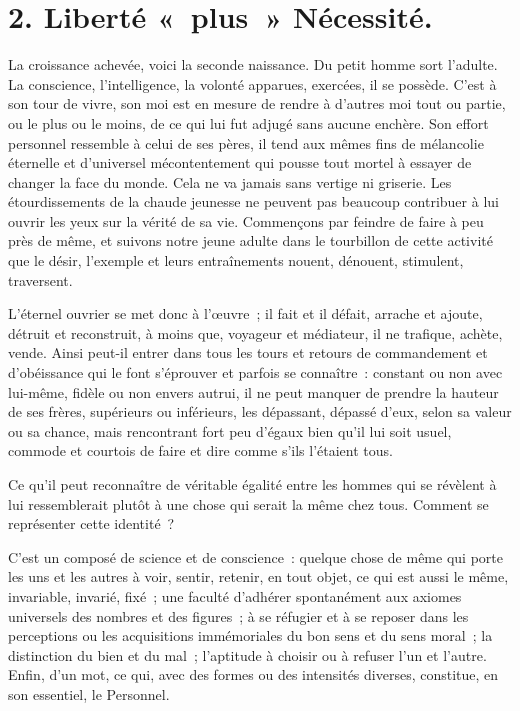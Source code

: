 \documentclass[french,twoside]{book} %
\begin{document}
\section[2. Liberté « plus » Nécessité.]{2. Liberté « plus » Nécessité.}
\noindent La croissance achevée, voici la seconde naissance. Du petit homme sort l’adulte. La conscience, l’intelligence, la volonté apparues, exercées, il se possède. C’est à son tour de vivre, son moi est en mesure de rendre à d’autres moi tout ou partie, ou le plus ou le moins, de ce qui lui fut adjugé sans aucune enchère. Son effort personnel ressemble à celui de ses pères, il tend aux mêmes fins de mélancolie éternelle et d’universel mécontentement qui pousse tout mortel à essayer de changer la face du monde. Cela ne va jamais sans vertige ni griserie. Les étourdissements de la chaude jeunesse ne peuvent pas beaucoup contribuer à lui ouvrir les yeux sur la vérité de sa vie. Commençons par feindre de faire à peu près de même, et suivons notre jeune adulte dans le tourbillon de cette activité que le désir, l’exemple et leurs entraînements nouent, dénouent, stimulent, traversent.\par
L’éternel ouvrier se met donc à l’œuvre ; il fait et il défait, arrache et ajoute, détruit et reconstruit, à moins que, voyageur et médiateur, il ne trafique, achète, vende. Ainsi peut-il entrer dans tous les tours et retours de commandement et d’obéissance qui le font s’éprouver et parfois se connaître : constant ou non avec lui-même, fidèle ou non envers autrui, il ne peut manquer de prendre la hauteur de ses frères, supérieurs ou inférieurs, les dépassant, dépassé d’eux, selon sa valeur ou sa chance, mais rencontrant fort peu d’égaux bien qu’il lui soit usuel, commode et courtois de faire et dire comme s’ils l’étaient tous.\par
Ce qu’il peut reconnaître de véritable égalité entre les hommes qui se révèlent à lui ressemblerait plutôt à une chose qui serait la même chez tous. Comment se représenter cette identité ?\par
C’est un composé de science et de conscience : quelque chose de même qui porte les uns et les autres à voir, sentir, retenir, en tout objet, ce qui est aussi le même, invariable, invarié, fixé ; une faculté d’adhérer spontanément aux axiomes universels des nombres et des figures ; à se réfugier et à se reposer dans les perceptions ou les acquisitions immémoriales du bon sens et du sens moral ; la distinction du bien et du mal ; l’aptitude à choisir ou à refuser l’un et l’autre. Enfin, d’un mot, ce qui, avec des formes ou des intensités diverses, constitue, en son essentiel, le Personnel.\par
\end{document}
